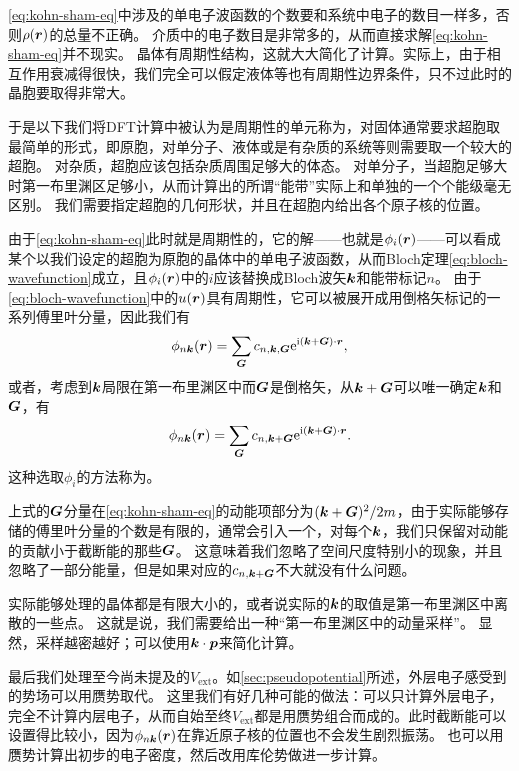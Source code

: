 \eqref{eq:kohn-sham-eq}中涉及的单电子波函数的个数要和系统中电子的数目一样多，否则$\rho(\vb*{r})$的总量不正确。
介质中的电子数目是非常多的，从而直接求解\eqref{eq:kohn-sham-eq}并不现实。
晶体有周期性结构，这就大大简化了计算。实际上，由于相互作用衰减得很快，我们完全可以假定液体等也有周期性边界条件，只不过此时的晶胞要取得非常大。

于是以下我们将DFT计算中被认为是周期性的单元称为，对固体通常要求超胞取最简单的形式，即原胞，对单分子、液体或是有杂质的系统等则需要取一个较大的超胞。
对杂质，超胞应该包括杂质周围足够大的体态。
对单分子，当超胞足够大时第一布里渊区足够小，从而计算出的所谓“能带”实际上和单独的一个个能级毫无区别。
我们需要指定超胞的几何形状，并且在超胞内给出各个原子核的位置。

由于\eqref{eq:kohn-sham-eq}此时就是周期性的，它的解——也就是$\phi_i(\vb*{r})$——可以看成某个以我们设定的超胞为原胞的晶体中的单电子波函数，从而Bloch定理\eqref{eq:bloch-wavefunction}成立，且$\phi_i(\vb*{r})$中的$i$应该替换成Bloch波矢$\vb*{k}$和能带标记$n$。
由于\eqref{eq:bloch-wavefunction}中的$u(\vb*{r})$具有周期性，它可以被展开成用倒格矢标记的一系列傅里叶分量，因此我们有
\begin{equation}
    \phi_{n \vb*{k}}(\vb*{r}) = \sum_{\vb*{G}} c_{n, \vb*{k}, \vb*{G}} \mathrm{e}^{\mathrm{i} (\vb*{k} + \vb*{G}) \cdot \vb*{r}},
\end{equation}
或者，考虑到$\vb*{k}$局限在第一布里渊区中而$\vb*{G}$是倒格矢，从$\vb*{k} + \vb*{G}$可以唯一确定$\vb*{k}$和$\vb*{G}$，有
\begin{equation}
    \phi_{n \vb*{k}}(\vb*{r}) = \sum_{\vb*{G}} c_{n, \vb*{k} + \vb*{G}} \mathrm{e}^{\mathrm{i} (\vb*{k} + \vb*{G}) \cdot \vb*{r}}.
\end{equation}
这种选取$\phi_i$的方法称为。

上式的$\vb*{G}$分量在\eqref{eq:kohn-sham-eq}的动能项部分为$(\vb*{k} + \vb*{G})^2 / 2m$，由于实际能够存储的傅里叶分量的个数是有限的，通常会引入一个，对每个$\vb*{k}$，我们只保留对动能的贡献小于截断能的那些$\vb*{G}$。
这意味着我们忽略了空间尺度特别小的现象，并且忽略了一部分能量，但是如果对应的$c_{n, \vb*{k} + \vb*{G}}$不大就没有什么问题。

实际能够处理的晶体都是有限大小的，或者说实际的$\vb*{k}$的取值是第一布里渊区中离散的一些点。
这就是说，我们需要给出一种“第一布里渊区中的动量采样”。
显然，采样越密越好；可以使用$\vb*{k} \cdot \vb*{p}$来简化计算。

最后我们处理至今尚未提及的$V_\text{ext}$。如\autoref{sec:pseudopotential}所述，外层电子感受到的势场可以用赝势取代。
这里我们有好几种可能的做法：可以只计算外层电子，完全不计算内层电子，从而自始至终$V_\text{ext}$都是用赝势组合而成的。此时截断能可以设置得比较小，因为$\phi_{n \vb*{k}}(\vb*{r})$在靠近原子核的位置也不会发生剧烈振荡。
也可以用赝势计算出初步的电子密度，然后改用库伦势做进一步计算。

